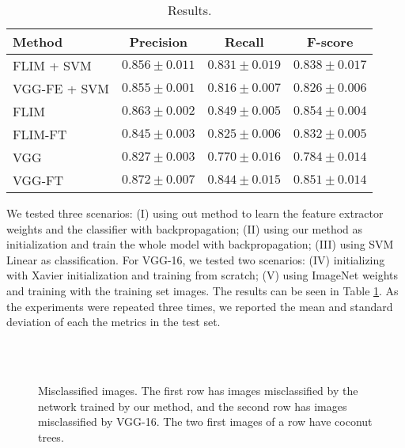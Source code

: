 \documentclass[a4paper,conference]{IEEEtran}
\begin{document}
\begin{table}[!t]
  \begin{center}
  \begin{tabular}{|l|c|c|c|}
  \hline
   Method & Precision & Recall & F-score \\
  \hline\hline
    FLIM + SVM & $0.856 \pm 0.011 $ & $ 0.831 \pm 0.019$ & $ 0.838 \pm 0.017$\\ 
    VGG-FE + SVM & $0.855 \pm 0.001$ & $0.816 \pm 0.007$ & $0.826 \pm 0.006 $ \\\hline
      
    FLIM & $0.863 \pm 0.002$ & $0.849 \pm 0.005$ & $0.854 \pm 0.004$\\
    FLIM-FT & $0.845 \pm 0.003$ & $0.825\pm 0.006$ & $0.832 \pm 0.005$ \\

    VGG & $0.827 \pm 0.003$ & $0.770 \pm 0.016$  & $ 0.784 \pm 0.014$\\
    VGG-FT & $0.872 \pm 0.007$ & $0.844 \pm 0.015$ & $0.851 \pm 0.014 $ \\
   
  \hline
  \end{tabular}
  \end{center}
  \caption{Results.}
  \label{tab:results}
\end{table}


We tested three scenarios: (I) using out method to learn the feature extractor weights and the classifier with backpropagation; (II) using our method as initialization and train the whole model with backpropagation; (III) using SVM Linear as classification. For VGG-16, we tested two scenarios: (IV) initializing with Xavier initialization and training from scratch; (V) using ImageNet weights and training with the training set images. The results can be seen in Table \ref{tab:results}. As the experiments were repeated three times, we reported the mean and standard deviation of each the metrics in the test set. 

\begin{figure}
  \centering
  ~
  ~
  \\
  ~
  ~
  \caption{Misclassified images. The first row has images misclassified by the network trained by our method, and the second row has images misclassified by VGG-16. The two first images of a row have coconut trees.}
  \label{fig:ex-classification}
\end{figure}
\end{document}
